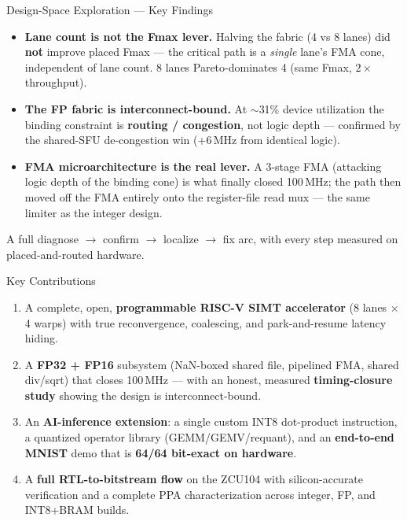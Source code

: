 \documentclass[aspectratio=169,11pt]{beamer}
\newcommand{\hl}[1]{{\color{simtixaccent}\textbf{#1}}}
\newcommand{\navy}[1]{{\color{simtixblue}\textbf{#1}}}
\begin{document}
\begin{frame}{Design-Space Exploration --- Key Findings}
  \begin{itemize}
    \item \navy{Lane count is not the Fmax lever.} Halving the fabric (4 vs 8 lanes) did \hl{not}
      improve placed Fmax --- the critical path is a \emph{single} lane's FMA cone, independent of
      lane count. 8 lanes Pareto-dominates 4 (same Fmax, $2\times$ throughput).
    \item \navy{The FP fabric is interconnect-bound.} At $\sim$31\% device utilization the binding
      constraint is \hl{routing / congestion}, not logic depth --- confirmed by the shared-SFU
      de-congestion win (+6\,MHz from identical logic).
    \item \navy{FMA microarchitecture is the real lever.} A 3-stage FMA (attacking logic depth of the
      binding cone) is what finally closed 100\,MHz; the path then moved off the FMA entirely onto
      the register-file read mux --- the same limiter as the integer design.
  \end{itemize}
  \vspace{0.2em}
  {\footnotesize A full diagnose $\rightarrow$ confirm $\rightarrow$ localize $\rightarrow$ fix arc,
  with every step measured on placed-and-routed hardware.}
\end{frame}

\begin{frame}{Key Contributions}
  \begin{enumerate}
    \item A complete, open, \hl{programmable RISC-V SIMT accelerator} (8 lanes $\times$ 4 warps)
      with true reconvergence, coalescing, and park-and-resume latency hiding.
    \item A \hl{FP32 + FP16} subsystem (NaN-boxed shared file, pipelined FMA, shared div/sqrt) that
      closes 100\,MHz --- with an honest, measured \navy{timing-closure study} showing the design is
      interconnect-bound.
    \item An \hl{AI-inference extension}: a single custom INT8 dot-product instruction, a quantized
      operator library (GEMM/GEMV/requant), and an \navy{end-to-end MNIST} demo that is
      \textbf{64/64 bit-exact on hardware}.
    \item A \hl{full RTL-to-bitstream flow} on the ZCU104 with silicon-accurate verification and a
      complete PPA characterization across integer, FP, and INT8+BRAM builds.
  \end{enumerate}
\end{frame}
\end{document}
